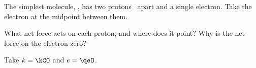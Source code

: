 The simplest molecule, , has two protons \dhO\ apart and a single electron. Take the electron at the midpoint between them.

\begin{abcliste}
\abc What net force acts on each proton, and where does it point?
\abc Why is the net force on the electron zero?
\end{abcliste}

Take $k = \kCO$ and $e = \qeO$.
